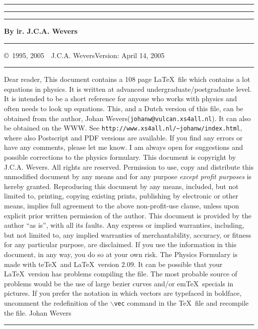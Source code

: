 \thispagestyle{empty}
\setcounter{page}{0}
\hrule
\rule{.4pt}{22.85cm}\hspace*{154mm}\rule{.4pt}{22.85cm}
\vspace*{-18cm}
\begin{center}
\Huge
{}
\end{center}
\vspace{2cm}
\centerline{\Large\bf By ir. J.C.A. Wevers}
\vspace*{2cm}
\vfill
\hrule
\newpage
\thispagestyle{empty}
\copyright~1995, 2005~~J.C.A. Wevers\hfill Version: April 14, 2005
\npar
\hrule
\par
\bigskip
Dear reader,
\npar
This document contains a 108 page \LaTeX\ file which contains a lot equations
in physics. It is written at advanced undergraduate/postgraduate level. It is
intended to be a short reference for anyone who works with physics and often
needs to look up equations.
\npar
This, and a Dutch version of this file, can be obtained from the author,
Johan Wevers\linebreak ({\tt johanw@vulcan.xs4all.nl}).
\npar
It can also be obtained on the WWW. See
{\tt http://www.xs4all.nl/\~{}johanw/index.html}, where also Postscript
and PDF versions are available.
\npar
If you find any errors or have any comments, please let me know. I am always
open for suggestions and possible corrections to the physics formulary.
\npar
This document is copyright by J.C.A. Wevers. All rights are
reserved. Permission to use, copy and distribute this unmodified document by
any means and for any purpose {\it except profit purposes} is hereby granted.
Reproducing this document by any means, included, but not limited to,
printing, copying existing prints, publishing by electronic or other means,
implies full agreement to the above non-profit-use clause, unless upon
explicit prior written permission of the author.
\npar
This document is provided by the author ``as is'', with all its faults. Any
express or implied warranties, including, but not limited to, any implied
warranties of merchantability, accuracy, or fitness for any particular
purpose, are disclaimed. If you use the information in this document, in
any way, you do so at your own risk.
\npar
The Physics Formulary is made with te\TeX\ and \LaTeX\ version 2.09. It can
be possible that your \LaTeX\ version has problems compiling the file. The
most probable source of problems would be the use of large bezier curves
and/or em\TeX\ specials in pictures. If you prefer the notation in which
vectors are typefaced in boldface, uncomment the redefinition of the
{\tt $\backslash$vec} command in the \TeX\ file and recompile the file.
\npar
Johan Wevers
\vfill
\hrule
\newpage

